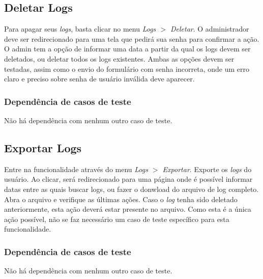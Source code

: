 \subsection{Deletar Logs}

Para apagar seus \textit{logs}, basta clicar no menu \textit{Logs $>$ Deletar}. O administrador deve ser redirecionado para uma tela que pedirá sua senha para confirmar a ação. O admin tem a opção de informar uma data a partir da qual os logs devem ser deletados, ou deletar todos os logs existentes. Ambas as opções devem ser testadas, assim como o envio do formulário com senha incorreta, onde um erro claro e preciso sobre senha de usuário inválida deve aparecer.

\subsubsection{Dependência de casos de teste}
Não há dependência com nenhum outro caso de teste.

\subsection{Exportar Logs}

Entre na funcionalidade através do menu \textit{Logs $>$ Exportar}. Exporte os \textit{logs} do usuário. Ao clicar, será redirecionado para uma página onde é possível informar datas entre as quais buscar logs, ou fazer o donwload do arquivo de log completo. Abra o arquivo e verifique as últimas ações. Caso o \textit{log} tenha sido deletado anteriormente, esta ação deverá estar presente no arquivo. Como esta é a única ação possível, não se faz necessário um  caso de teste específico para esta funcionalidade.

\subsubsection{Dependência de casos de teste}
Não há dependência com nenhum outro caso de teste.